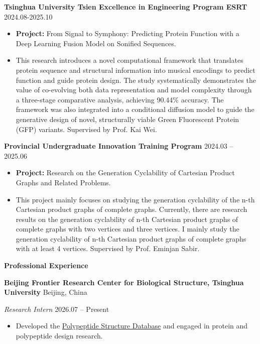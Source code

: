 \documentclass[11pt]{article}
\begin{document}
	\textbf{Tsinghua University Tsien Excellence in Engineering Program ESRT} \hfill 2024.08-2025.10
	\begin{itemize}[noitemsep, topsep=0pt, partopsep=0pt, parsep=0pt, leftmargin=*]
		\item \textbf{Project:} From Signal to Symphony: Predicting Protein Function with a Deep Learning Fusion Model on Sonified Sequences.
		\item This research introduces a novel computational framework that translates protein sequence and structural information into musical encodings to predict function and guide protein design. The study systematically demonstrates the value of co-evolving both data representation and model complexity through a three-stage comparative analysis, achieving 90.44\% accuracy. The framework was also integrated into a conditional diffusion model to guide the generative design of novel, structurally viable Green Fluorescent Protein (GFP) variants. Supervised by Prof. Kai Wei.
	\end{itemize}
	
	\vspace{10pt}
	
	\textbf{Provincial Undergraduate Innovation Training Program} \hfill 2024.03 – 2025.06
	\begin{itemize}[noitemsep, topsep=0pt, partopsep=0pt, parsep=0pt, leftmargin=*]
		\item \textbf{Project:} Research on the Generation Cyclability of Cartesian Product Graphs and Related Problems.
		\item This project mainly focuses on studying the generation cyclability of the n-th Cartesian product graphs of complete graphs. Currently, there are research results on the generation cyclability of n-th Cartesian product graphs of complete graphs with two vertices and three vertices. I mainly study the generation cyclability of n-th Cartesian product graphs of complete graphs with at least 4 vertices. Supervised by Prof. Eminjan Sabir.
	\end{itemize}
	
	\vspace{12pt}
	
	\clearpage
	\begin{center}
		\textbf{\large Professional Experience}
	\end{center}
	\textbf{Beijing Frontier Research Center for Biological Structure, Tsinghua University} \hfill Beijing, China
	
	\textit{Research Intern} \hfill 2026.07 – Present
	\begin{itemize}[noitemsep, topsep=0pt, partopsep=0pt, parsep=0pt, leftmargin=*]
		\item Developed the \href{https://www.frcbs.tsinghua.edu.cn/cpdb/}{Polypeptide Structure Database} and engaged in protein and polypeptide design research.
	\end{itemize}
	
\end{document}

